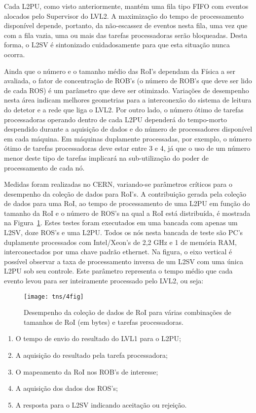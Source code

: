 Cada L2PU, como visto anteriormente, mantém uma fila tipo FIFO com eventos
alocados pelo Supervisor do LVL2. A maximização do tempo de processamento
disponível depende, portanto, da não-escassez de eventos nesta fila, uma vez
que com a fila vazia, uma ou mais das tarefas processadoras serão
bloqueadas. Desta forma, o L2SV é sintonizado cuidadosamente para que esta
situação nunca ocorra.

Ainda que o número e o tamanho médio das RoI's dependam da Física a ser
avaliada, o fator de concentração de ROB's (o número de ROB's que deve ser
lido de cada ROS) é um parâmetro que deve ser otimizado. Variações de
desempenho nesta área indicam melhores geometrias para a interconexão do
sistema de leitura do detetor e a rede que liga o LVL2. Por outro lado, o
número ótimo de tarefas processadoras operando dentro de cada L2PU dependerá
do tempo-morto despendido durante a aquisição de dados e do número de
processadores disponível em cada máquina. Em máquinas duplamente processadas,
por exemplo, o número ótimo de tarefas processadoras deve estar entre 3 e 4,
já que o uso de um número menor deste tipo de tarefas implicará na
sub-utilização do poder de processamento de cada nó.

Medidas foram realizadas no CERN, variando-se parâmetros críticos para o
desempenho da coleção de dados para RoI's. A contribuição gerada pela coleção
de dados para uma RoI, ao tempo de processamento de uma L2PU em função do
tamanho da RoI e o número de ROS's na qual a RoI está distribuída, é mostrada
na Figura~\ref{fig:tns-4fig}. Estes testes foram executados em uma bancada com
apenas um L2SV, doze ROS's e uma L2PU. Todos os nós nesta bancada de teste são
PC's duplamente processados com Intel/Xeon's de 2,2 GHz e 1  de
memória RAM, interconectados por uma chave padrão  ethernet. Na
figura, o eixo vertical é possível observar a taxa de processamento inversa de
um L2SV com uma única L2PU sob seu controle. Este parâmetro representa o tempo
médio que cada evento levou para ser inteiramente processado pelo LVL2, ou
seja:

\begin{figure}
\begin{center}
\texttt{[image: tns/4fig]}
\end{center}
\caption{Desempenho da coleção de dados de RoI para várias combinações de
tamanhos de RoI (em bytes) e tarefas processadoras.}
\label{fig:tns-4fig}
\end{figure}

\begin{enumerate}
\item O tempo de envio do resultado do LVL1 para o L2PU;
\item A aquisição do resultado pela tarefa processadora;
\item O mapeamento da RoI nos ROB's de interesse;
\item A aquisição dos dados dos ROS's;
\item A resposta para o L2SV indicando aceitação ou rejeição.
\end{enumerate}


